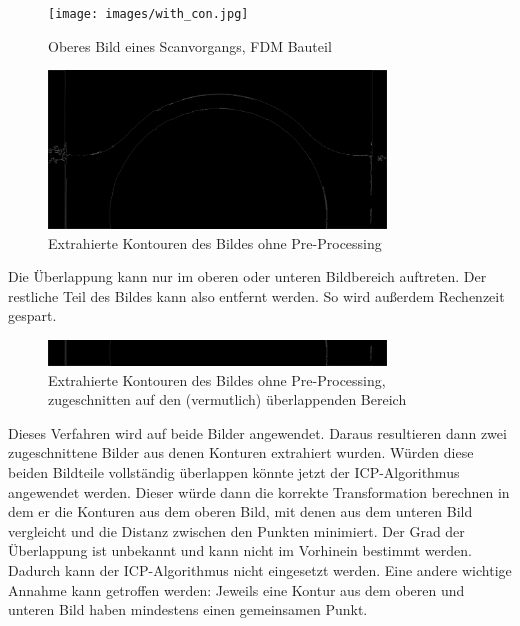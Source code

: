 \documentclass[../main.tex]{subfiles}
\begin{document}
\begin{figure}[h]
    \centering
    \texttt{[image: images/with\_con.jpg]} %
    \caption{Oberes Bild eines Scanvorgangs, FDM Bauteil}
    \label{fig:image_top}
\end{figure}

\begin{figure}[h]
    \centering
    \includegraphics[width=0.8\textwidth]{images/only_con.jpg} %
    \caption{Extrahierte Kontouren des Bildes ohne Pre-Processing}
    \label{fig:cons}
\end{figure}

Die Überlappung kann nur im oberen oder unteren Bildbereich auftreten. Der restliche 
Teil des Bildes kann also entfernt werden. So wird außerdem Rechenzeit gespart.

\begin{figure}[h]
    \centering
    \includegraphics[width=0.8\textwidth]{images/only_con_cut.jpg} %
    \caption{Extrahierte Kontouren des Bildes ohne Pre-Processing, zugeschnitten 
    auf den (vermutlich) überlappenden Bereich}
    \label{fig:cons_cut}
\end{figure}

Dieses Verfahren wird auf beide Bilder angewendet. Daraus resultieren dann zwei 
zugeschnittene Bilder aus denen Konturen extrahiert wurden. 
Würden diese beiden Bildteile vollständig überlappen könnte jetzt der ICP-Algorithmus
angewendet werden. Dieser würde dann die korrekte Transformation berechnen in dem er 
die Konturen aus dem oberen Bild, mit denen aus dem unteren Bild vergleicht und die 
Distanz zwischen den Punkten minimiert. 
Der Grad der Überlappung ist unbekannt und kann nicht im Vorhinein bestimmt werden.
Dadurch kann der ICP-Algorithmus nicht eingesetzt werden. 
Eine andere wichtige Annahme kann getroffen werden: Jeweils eine Kontur aus 
dem oberen und unteren Bild haben mindestens einen gemeinsamen Punkt.
\end{document}
